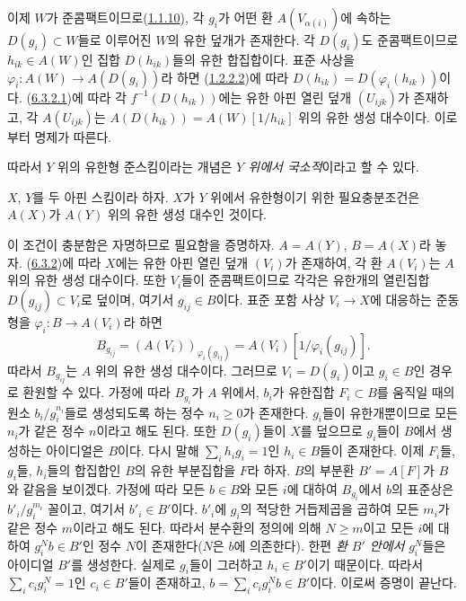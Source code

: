 이제 $W$가 준콤팩트이므로(\hyperref[I.1.1.10-ko]{1.1.10}), 각
$g_i$가 어떤 환 $A(V_{\alpha(i)})$에 속하는
$D(g_i)\subset W$들로 이루어진 $W$의 유한 덮개가 존재한다. 각
$D(g_i)$도 준콤팩트이므로
$h_{ik}\in A(W)$인 집합 $D(h_{ik})$들의 유한 합집합이다. 표준 사상을
$\varphi_i:A(W)\to A(D(g_i))$라 하면
(\hyperref[I.1.2.2.2-ko]{1.2.2.2})에 따라
$D(h_{ik})=D(\varphi_i(h_{ik}))$이다.
(\hyperref[I.6.3.2.1-ko]{6.3.2.1})에 따라 각
$f^{-1}(D(h_{ik}))$에는 유한 아핀 열린 덮개 $(U_{ijk})$가 존재하고,
각 $A(U_{ijk})$는
$A(D(h_{ik}))=A(W)[1/h_{ik}]$ 위의 유한 생성 대수이다. 이로부터 명제가
따른다.

따라서 $Y$ 위의 유한형 준스킴이라는 개념은 \emph{$Y$ 위에서
국소적}이라고 할 수 있다.

\begin{proposition}[6.3.3]
\label{I.6.3.3-ko}
$X$, $Y$를 두 아핀 스킴이라 하자. $X$가 $Y$ 위에서 유한형이기 위한
필요충분조건은 $A(X)$가 $A(Y)$ 위의 유한 생성 대수인 것이다.
\end{proposition}

이 조건이 충분함은 자명하므로 필요함을 증명하자. $A=A(Y)$,
$B=A(X)$라 놓자. (\hyperref[I.6.3.2-ko]{6.3.2})에 따라 $X$에는 유한
아핀 열린 덮개 $(V_i)$가 존재하여, 각 환 $A(V_i)$는 $A$ 위의 유한 생성
대수이다. 또한 $V_i$들이 준콤팩트이므로 각각은 유한개의 열린집합
$D(g_{ij})\subset V_i$로 덮이며, 여기서 $g_{ij}\in B$이다. 표준 포함
사상 $V_i\to X$에 대응하는 준동형을
$\varphi_i:B\to A(V_i)$라 하면
\[
  B_{g_{ij}}=(A(V_i))_{\varphi_i(g_{ij})}
  =A(V_i)[1/\varphi_i(g_{ij})].
\]
따라서 $B_{g_{ij}}$는 $A$ 위의 유한 생성 대수이다. 그러므로
$V_i=D(g_i)$이고 $g_i\in B$인 경우로 환원할 수 있다. 가정에 따라
$B_{g_i}$가 $A$ 위에서, $b_i$가 유한집합 $F_i\subset B$를 움직일 때의
원소 $b_i/g_i^{n_i}$들로 생성되도록 하는 정수 $n_i\geq0$가 존재한다.
$g_i$들이 유한개뿐이므로 모든 $n_i$가 같은 정수 $n$이라고 해도 된다.
또한 $D(g_i)$들이 $X$를 덮으므로 $g_i$들이 $B$에서 생성하는
아이디얼은 $B$이다. 다시 말해
$\sum_i h_i g_i=1$인 $h_i\in B$들이 존재한다. 이제 $F_i$들, $g_i$들,
$h_i$들의 합집합인 $B$의 유한 부분집합을 $F$라 하자. $B$의 부분환
$B'=A[F]$가 $B$와 같음을 보이겠다. 가정에 따라 모든 $b\in B$와 모든
$i$에 대하여 $B_{g_i}$에서 $b$의 표준상은 $b'_i/g_i^{m_i}$ 꼴이고,
여기서 $b'_i\in B'$이다. $b'_i$에 $g_i$의 적당한 거듭제곱을 곱하여
모든 $m_i$가 같은 정수 $m$이라고 해도 된다. 따라서 분수환의 정의에
의해 $N\geq m$이고 모든 $i$에 대하여 $g_i^N b\in B'$인 정수
$N$이 존재한다($N$은 $b$에 의존한다). 한편 \emph{환 $B'$ 안에서}
$g_i^N$들은 아이디얼 $B'$를 생성한다. 실제로 $g_i$들이 그러하고
$h_i\in B'$이기 때문이다. 따라서
$\sum_i c_i g_i^N=1$인 $c_i\in B'$들이 존재하고,
$b=\sum_i c_i g_i^N b\in B'$이다. 이로써 증명이 끝난다.

